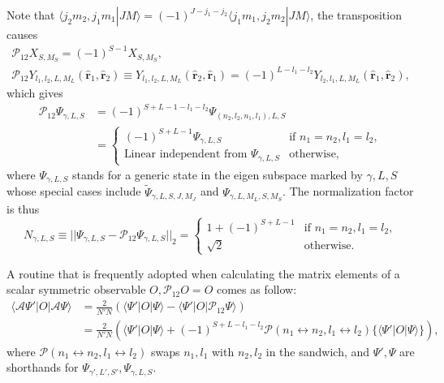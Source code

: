 \documentclass{article}
\begin{document}
Note that $\langle j_2m_2,j_1m_1 | JM\rangle = (-1)^{J-j_1-j_2}\langle j_1m_1,j_2m_2 | JM\rangle$, the transposition causes
\begin{gather}
\mathcal P_{12}X_{S,M_S} = (-1)^{S-1}X_{S,M_S},\\
\mathcal P_{12}Y_{l_1,l_2,L,M_L}(\bm{\hat r}_1,\bm{\hat r}_2)\equiv Y_{l_1,l_2,L,M_L}(\bm{\hat r}_2,\bm{\hat r}_1) = (-1)^{L-l_1-l_2}Y_{l_2,l_1,L,M_L}(\bm{\hat r}_1,\bm{\hat r}_2),
\end{gather}
which gives
\begin{align}
\mathcal P_{12}\Psi_{\gamma,L,S} &= (-1)^{S+L-1-l_1-l_2} \Psi_{(n_2,l_2,n_1,l_1),L,S} \label{eq:P12Psi}\\
&=\left\{
\begin{array}{ll}
(-1)^{S+L-1}\Psi_{\gamma,L,S} & \text{if }n_1=n_2, l_1=l_2 ,\\
\text{Linear independent from }\Psi_{\gamma,L,S} &\text{otherwise} ,
\end{array}\right.
\end{align}
where $\Psi_{\gamma,L,S}$ stands for a generic state in the eigen subspace marked by $\gamma, L,S$ whose special cases include $\tilde\Psi_{\gamma,L,S,J,M_J}$ and $\Psi_{\gamma,L,M_L,S,M_S}$. The normalization factor is thus
\begin{equation}
N_{\gamma,L,S} \equiv ||\Psi_{\gamma,L,S}-\mathcal P_{12} \Psi_{\gamma,L,S}||_2 = \left\{
\begin{array}{ll}
1+(-1)^{S+L-1} & \text{if }n_1=n_2, l_1=l_2 ,\\
\sqrt{2} &\text{otherwise} .
\end{array}\right.
\end{equation}

A routine that is frequently adopted when calculating the matrix elements of a scalar symmetric observable $O, \mathcal{P}_{12}O = O$ comes as follow:
\begin{align}
\langle \mathcal A\Psi' |O| \mathcal A\Psi\rangle &= \frac{2}{N'N}\left(\langle\Psi'|O|\Psi\rangle - \langle\Psi'|O|\mathcal P_{12}\Psi\rangle\right) \nonumber\\
&= \frac{2}{N'N}\left(\langle\Psi'|O|\Psi\rangle+(-1)^{S+L-l_1-l_2} \mathcal P(n_1\leftrightarrow n_2, l_1\leftrightarrow l_2)\{\langle\Psi'|O|\Psi\rangle\}\right),\label{eq:OO}
\end{align}
where $\mathcal P(n_1\leftrightarrow n_2, l_1\leftrightarrow l_2)$ swaps $n_1,l_1$ with $n_2,l_2$ in the sandwich, and $\Psi',\Psi$ are shorthands for $\Psi_{\gamma',L',S'}, \Psi_{\gamma,L,S}$.
\end{document}
